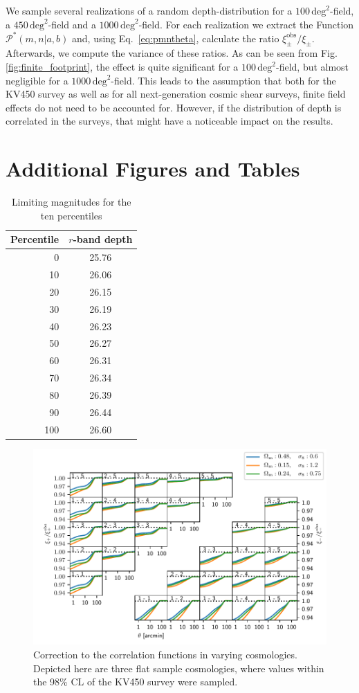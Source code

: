 \documentclass{aa}
\renewcommand{\rm}{\mathrm}
\begin{document}
\begin{appendix}
We sample several realizations of a random depth-distribution for a $100\,\rm{deg}^2$-field, a $450\,\rm{deg}^2$-field and a $1000\,\rm{deg}^2$-field. For each realization we extract the Function $\mathcal{P}^*(m,n|a,b)$ and, using Eq.~\eqref{eq:pmntheta}, calculate the ratio $\xi_\pm^{\rm{obs}}/\xi_\pm$. Afterwards, we compute the variance of these ratios. As can be seen from Fig. \ref{fig:finite_footprint}, the effect is quite significant for a $100\,\rm{deg}^2$-field, but almost negligible for a $1000\,\rm{deg}^2$-field. This leads to the assumption that both for the KV450 survey as well as for all next-generation cosmic shear surveys, finite field effects do not need to be accounted for. However, if the distribution of depth is correlated in the surveys, that might have a noticeable impact on the results.

\section{Additional Figures and Tables}
\begin{table}[h]
\centering
\caption{Limiting magnitudes for the ten percentiles}
\label{tab:maglim}
\begin{tabular}{r c}
\hline\hline
Percentile & $r$-band depth \\
\hline
0 & 25.76 \\
10 & 26.06 \\
20 & 26.15 \\
30 & 26.19 \\
40 & 26.23 \\
50 & 26.27 \\
60 & 26.31 \\
70 & 26.34 \\
80 & 26.39 \\
90 & 26.44 \\
100 & 26.60 \\
\hline
\end{tabular}
\end{table}
\begin{figure}[h]
\centering
\includegraphics[width=0.9\linewidth]{images/compare_cosmos.pdf}
\caption{Correction to the correlation functions in varying cosmologies. Depicted here are three flat sample cosmologies, where values within the 98\% CL of the KV450 survey were sampled.}
\label{fig:comparecosmo}
\end{figure}
\end{appendix}
\end{document}
